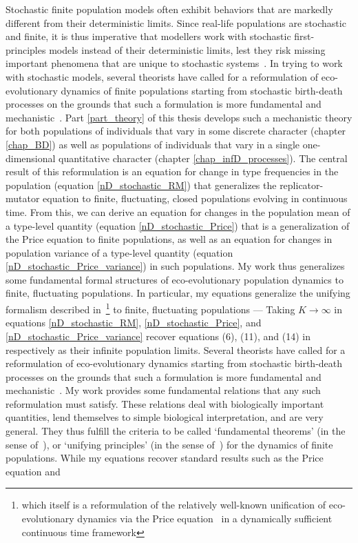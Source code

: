 Stochastic finite population models often exhibit behaviors that are markedly different from their deterministic limits. Since real-life populations are stochastic and finite, it is thus imperative that modellers work with stochastic first-principles models instead of their deterministic limits, lest they risk missing important phenomena that are unique to stochastic systems~\citep{black_stochastic_2012,schreiber_does_2022,hastings_transients_2004,shoemaker_integrating_2020}. In trying to work with stochastic models, several theorists have called for a reformulation of eco-evolutionary dynamics of finite populations starting from stochastic birth-death processes on the grounds that such a formulation is more fundamental and mechanistic~\citep{metcalf_why_2007,geritz_mathematical_2012,doebeli_towards_2017}. Part \ref{part_theory} of this thesis develops such a mechanistic theory for both populations of individuals that vary in some discrete character (chapter \ref{chap_BD}) as well as populations of individuals that vary in a single one-dimensional quantitative character (chapter \ref{chap_infD_processes}). The central result of this reformulation is an equation for change in type frequencies in the population (equation \eqref{nD_stochastic_RM}) that generalizes the replicator-mutator equation to finite, fluctuating, closed populations evolving in continuous time. From this, we can derive an equation for changes in the population mean of a type-level quantity (equation \eqref{nD_stochastic_Price}) that is a generalization of the Price equation to finite populations, as well as an equation for changes in population variance of a type-level quantity (equation \eqref{nD_stochastic_Price_variance}) in such populations. My work thus generalizes some fundamental formal structures of eco-evolutionary population dynamics to finite, fluctuating populations. In particular, my equations generalize the unifying formalism described in~\cite{lion_theoretical_2018}\footnote{which itself is a reformulation of the relatively well-known unification of eco-evolutionary dynamics via the Price equation~\citep{frank_natural_2012, queller_fundamental_2017, luque_mirror_2021} in a dynamically sufficient continuous time framework} to finite, fluctuating populations --- Taking $K \to \infty$ in equations \eqref{nD_stochastic_RM}, \eqref{nD_stochastic_Price}, and \eqref{nD_stochastic_Price_variance} recover equations (6), (11), and (14) in~\cite{lion_theoretical_2018} respectively as their infinite population limits. Several theorists have called for a reformulation of eco-evolutionary dynamics starting from stochastic birth-death processes on the grounds that such a formulation is more fundamental and mechanistic~\citep{metcalf_why_2007,geritz_mathematical_2012,doebeli_towards_2017}. My work provides some fundamental relations that any such reformulation must satisfy. These relations deal with biologically important quantities, lend themselves to simple biological interpretation, and are very general. They thus fulfill the criteria to be called `fundamental theorems' (in the sense of~\cite{queller_fundamental_2017}), or `unifying principles' (in the sense of~\cite{lion_theoretical_2018}) for the dynamics of finite populations. While my equations recover standard results such as the Price equation and 